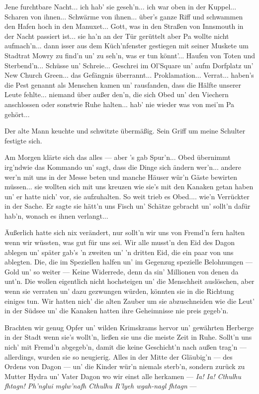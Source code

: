\glqq Jene furchtbare Nacht... ich hab' sie geseh'n... ich war oben in der Kuppel... Scharen von ihnen... Schwärme von ihnen... über's ganze Riff und schwammen den Hafen hoch in den Manuxet... Gott, was in den Straßen von Innsmouth in der Nacht passiert ist... sie ha'n an der Tür gerüttelt aber Pa wollte nicht aufmach'n... dann isser aus dem Küch'nfenster gestiegen mit seiner Muskete um Stadtrat Mowry zu find'n un' zu seh'n, was er tun könnt'... Haufen von Toten und Sterbend'n... Schüsse un' Schreie... Geschrei im Ol'Square un' aufm Dorfplatz un' New Church Green... das Gefängnis überrannt... Proklamation... Verrat... haben's die Pest genannt als Menschen kamen un' rausfanden, dass die Hälfte unserer Leute fehlte... niemand über außer den'n, die sich Obed un' den Viechern anschlossen oder sonstwie Ruhe halten... hab' nie wieder was von mei'm Pa gehört...\grqq

Der alte Mann keuchte und schwitzte übermäßig. Sein Griff um meine Schulter festigte sich.

\glqq Am Morgen klärte sich das alles --- aber 's gab Spur'n... Obed übernimmt irg'ndwie das Kommando un' sagt, dass die Dinge sich ändern wer'n... andere wer'n mit uns in der Messe beten und manche Häuser wür'n Gäste bewirten müssen... sie wollten sich mit uns kreuzen wie sie's mit den Kanaken getan haben un' er hatte nich' vor, sie aufzuhalten. So weit trieb es Obed.... wie'n Verrückter in der Sache. Er sagte sie hätt'n uns Fisch un' Schätze gebracht un' sollt'n dafür hab'n, wonach es ihnen verlangt...

Äußerlich hatte sich nix verändert, nur sollt'n wir uns von Fremd'n fern halten wenn wir wüssten, was gut für uns sei. Wir alle musst'n den Eid des Dagon ablegen un' später gab's 'n zweiten un' 'n dritten Eid, die ein paar von uns ablegten. Die, die im Speziellen halfen un' im Gegenzug spezielle Belohnungen --- Gold un' so weiter --- Keine Widerrede, denn da sin' Millionen von denen da unt'n. Die wollen eigentlich nicht hochsteigen un' die Menschheit auslöschen, aber wenn sie verraten un' dazu gezwungen würden, könnten sie in die Richtung einiges tun. Wir hatten nich' die alten Zauber um sie abzuschneiden wie die Leut' in der Südsee un' die Kanaken hatten ihre Geheimnisse nie preis gegeb'n.

Brachten wir genug Opfer un' wilden Krimskrams hervor un' gewährten Herberge in der Stadt wenn sie's wollt'n, ließen sie uns die meiste Zeit in Ruhe. Sollt'n uns nich' mit Fremd'n abgegeb'n, damit die keine Geschicht'n nach außen trag'n --- allerdings, wurden sie so neugierig. Alles in der Mitte der Gläubig'n --- des Ordens von Dagon --- un' die Kinder wür'n niemals sterb'n, sondern zurück zu Mutter Hydra un' Vater Dagon wo wir einst alle herkamen --- \textit{Ia! Ia! Cthulhu fhtagn! Ph’nglui mglw’nafh Cthulhu R’lyeh wgah-nagl fhtagn} ---
\grqq


